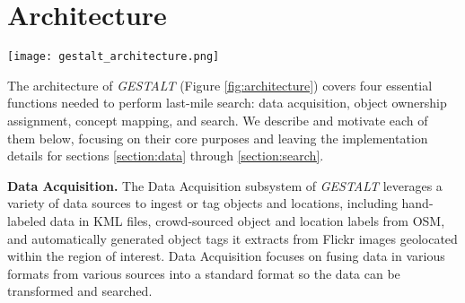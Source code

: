 \section{Architecture}
\label{section:architecture}

\begin{figure*}[t]
    \texttt{[image: gestalt\_architecture.png]}
    \centering
    \caption[width=\textwidth]{The architecture of \emph{GESTALT} consists of the data collection subsystem, the ownership assignment process, the concept mapping process, and the search subsystem.}
    \label{fig:architecture}
\end{figure*}



The architecture of \textit{GESTALT} (Figure \ref{fig:architecture}) covers four essential functions needed to perform last-mile search: data acquisition, object ownership assignment, concept mapping, and search. 
We describe and motivate each of them below, focusing on their core purposes and leaving the implementation details for sections \ref{section:data} through \ref{section:search}. 

\textbf{Data Acquisition.}
The Data Acquisition subsystem of \emph{GESTALT} leverages a variety of data sources to ingest or tag objects and locations, including hand-labeled data in KML files, crowd-sourced object and location labels from OSM, and automatically generated object tags it extracts from Flickr images geolocated within the region of interest. 
Data Acquisition focuses on fusing data in various formats from various sources into a standard format so the data can be transformed and searched.

